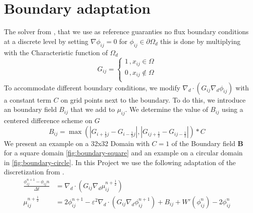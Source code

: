 \documentclass{mimosis}
\begin{document}
\chapter{Boundary adaptation}
\label{sec:orga771c15}
The solver from \autocite{SHIN20117441}, that we use as reference guaranties no flux boundary conditions at a discrete level by setting \(\nabla \phi_{ij} = 0\) for \(\phi_{ij} \in \partial \Omega_{d}\) this is done by multiplying with the Characteristic function of \(\Omega_{d}\)
\begin{equation}
G_{ij}=
\begin{cases}
1 \,, x_{ij} \in \Omega \\
0 \,, x_{ij} \not\in \Omega \\
\end{cases}
\end{equation}
To accommodate different boundary conditions, we modify \(\nabla_d \cdot (G_{ij} \nabla_d \phi_{ij})\) with a constant term \(C\) on grid points next to the boundary. To do this, we introduce an boundary field \(B_{ij}\) that we add to \(\mu_{ij}\). We determine the value of \(B_{ij}\) using a centered difference scheme on \(G\)
\begin{equation}
B_{ij} = \max\left(  |G_{i+\frac{1}{2}j} - G_{i-\frac{1}{2}j}| , |G_{ij+\frac{1}{2}} - G_{ij-\frac{1}{2}}|\right) * C
\end{equation}
We present an  example on a 32x32 Domain with \(C=1\) of the Boundary field \(\mathbf{B}\) for a square domain \ref{fig:boundary-square} and an example on a circular domain in \ref{fig:boundary-circle}.
In this Project we use the following adaptation of the discretization from \autocite{SHIN20117441}.
\begin{equation}
\label{eq:second-order-adapted-ansatz}
\begin{aligned}
\frac{\phi_{ij}^{n+1} - \phi_{ij}n}{\Delta t}  &=  \nabla _d \cdot (G_{ij} \nabla_d \mu_{ij}^{n+\frac{1}{2}} )  \\
 \mu_{ij}^{n+\frac{1}{2}} &= 2\phi_{ij}^{n+1} - \varepsilon^2  \nabla_d \cdot  (G_{ij} \nabla _d \phi_{ij}^{n+1} ) + B_{ij} + W'(\phi_{ij}^n) - 2\phi _{ij}^n
\end{aligned}
\end{equation}
\end{document}
